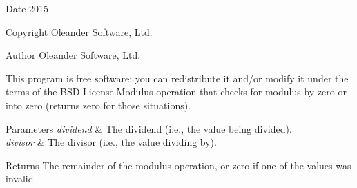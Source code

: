 \begin{DoxyDate}{Date}
2015 
\end{DoxyDate}
\begin{DoxyCopyright}{Copyright}
Oleander Software, Ltd. 
\end{DoxyCopyright}
\begin{DoxyAuthor}{Author}
Oleander Software, Ltd.
\end{DoxyAuthor}
This program is free software; you can redistribute it and/or modify it under the terms of the B\-S\-D License.\-Modulus operation that checks for modulus by zero or into zero (returns zero for those situations). 
\begin{DoxyParams}{Parameters}
{\em dividend} & The dividend (i.\-e., the value being divided). \\
\hline
{\em divisor} & The divisor (i.\-e., the value dividing by). \\
\hline
\end{DoxyParams}
\begin{DoxyReturn}{Returns}
The remainder of the modulus operation, or zero if one of the values was invalid. 
\end{DoxyReturn}
